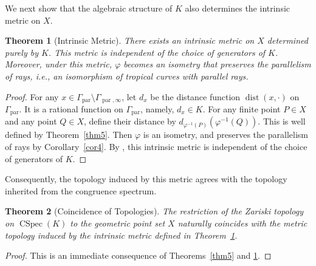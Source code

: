 \documentclass[a4paper,12pt]{amsart}
\theoremstyle{plain}
\newtheorem{theorem}{Theorem}[section]
\theoremstyle{definition}
\begin{document}
We next show that the algebraic structure of $K$ also determines the intrinsic metric on $X$.

\begin{theorem}[Intrinsic Metric]
    \label{thm6}
There exists an intrinsic metric on $X$ determined purely by $K$.
This metric is independent of the choice of generators of $K$.
Moreover, under this metric, $\varphi$ becomes an isometry that preserves the parallelism of rays, i.e., an isomorphism of tropical curves with parallel rays.
\end{theorem}

\begin{proof}
For any $x \in \varGamma_{\operatorname{par}} \setminus \varGamma_{\operatorname{par}, \infty}$, let $d_x$ be the distance function $\operatorname{dist}(x, \cdot)$ on $\varGamma_{\operatorname{par}}$.
It is a rational function on $\varGamma_{\operatorname{par}}$, namely, $d_x \in K$.
For any finite point $P \in X$ and any point $Q \in X$, define their distance by $d_{\varphi^{-1}(P)}(\varphi^{-1}(Q))$.
This is well defined by Theorem~\ref{thm5}.
Then $\varphi$ is an isometry, and preserves the parallelism of rays by Corollary~\ref{cor4}.
By \cite[Proposition~4.6]{JuAe7}, this intrinsic metric is independent of the choice of generators of $K$.
\end{proof}

Consequently, the topology induced by this metric agrees with the topology inherited from the congruence spectrum.

\begin{theorem}[Coincidence of Topologies]
    \label{thm7}
The restriction of the Zariski topology on $\operatorname{CSpec}(K)$ to the geometric point set $X$ naturally coincides with the metric topology induced by the intrinsic metric defined in Theorem~\ref{thm6}.
\end{theorem}

\begin{proof}
This is an immediate consequence of Theorems~\ref{thm5} and \ref{thm6}.
\end{proof}



\end{document}
